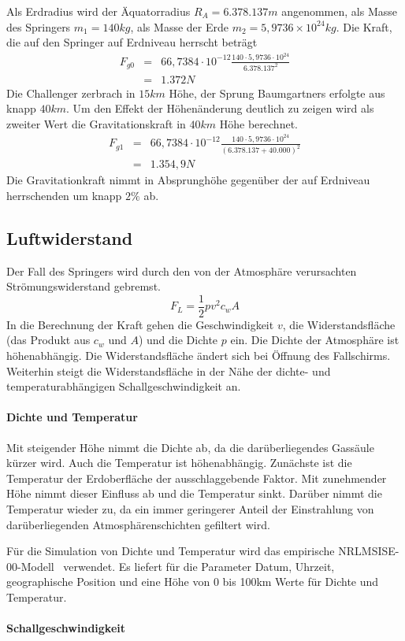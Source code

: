 Als Erdradius wird der Äquatorradius $R_A=6.378.137m$ angenommen, als Masse des Springers $m_1=140kg$, als Masse der Erde $m_2=5,9736\times 10^{24}kg$.
Die Kraft, die auf den Springer auf Erdniveau herrscht beträgt
\begin{eqnarray}
F_{g0} &=& 66,7384\cdot 10^{-12} \frac{140\cdot 5,9736\cdot 10^{24}}{6.378.137^2} \\
 &=& 1.372 N \nonumber
\end{eqnarray}
Die Challenger zerbrach in $15km$ Höhe, der Sprung Baumgartners erfolgte aus knapp $40km$.
Um den Effekt der Höhenänderung deutlich zu zeigen wird als zweiter Wert die Gravitationskraft in $40km$ Höhe berechnet.
\begin{eqnarray}
F_{g1} &=& 66,7384\cdot 10^{-12} \frac{140\cdot 5,9736\cdot 10^{24}}{\left(6.378.137 + 40.000\right)^2} \\
 &=& 1.354,9 N \nonumber
\end{eqnarray}
Die Gravitationkraft nimmt in Absprunghöhe gegenüber der auf Erdniveau herrschenden um knapp $2\%$ ab.

\subsection{Luftwiderstand}
Der Fall des Springers wird durch den von der Atmosphäre verursachten Strömungswiderstand gebremst.
\begin{equation}
F_L=\frac{1}{2}pv^2c_wA
\end{equation}
In die Berechnung der Kraft gehen die Geschwindigkeit $v$, die Widerstandsfläche (das Produkt aus $c_w$ und $A$) und die Dichte $p$ ein.
Die Dichte der Atmosphäre ist höhenabhängig.
Die Widerstandsfläche ändert sich bei Öffnung des Fallschirms.
Weiterhin steigt die Widerstandsfläche in der Nähe der dichte- und temperaturabhängigen Schallgeschwindigkeit an.

\paragraph{Dichte und Temperatur}
Mit steigender Höhe nimmt die Dichte ab, da die darüberliegendes Gassäule kürzer wird.
Auch die Temperatur ist höhenabhängig.
Zunächste ist die Temperatur der Erdoberfläche der ausschlaggebende Faktor.
Mit zunehmender Höhe nimmt dieser Einfluss ab und die Temperatur sinkt.
Darüber nimmt die Temperatur wieder zu, da ein immer geringerer Anteil der Einstrahlung von darüberliegenden Atmosphärenschichten gefiltert wird.

Für die Simulation von Dichte und Temperatur wird das empirische NRLMSISE-00-Modell~\cite{nrlmsise00:goddardspaceflightcenter} verwendet.
Es liefert für die Parameter Datum, Uhrzeit, geographische Position und eine Höhe von 0 bis 100km Werte für Dichte und Temperatur.


\paragraph{Schallgeschwindigkeit}

